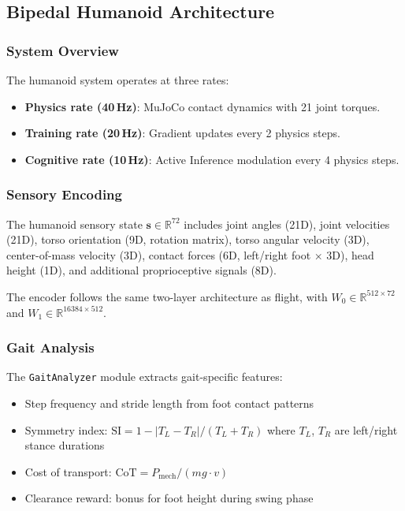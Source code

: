 \documentclass[11pt,a4paper]{article}
\begin{document}
\subsection{Bipedal Humanoid Architecture}

\subsubsection{System Overview}

The humanoid system operates at three rates:
\begin{itemize}
  \item \textbf{Physics rate (40\,Hz)}: MuJoCo contact dynamics with 21 joint torques.
  \item \textbf{Training rate (20\,Hz)}: Gradient updates every 2 physics steps.
  \item \textbf{Cognitive rate (10\,Hz)}: Active Inference modulation every 4 physics steps.
\end{itemize}

\subsubsection{Sensory Encoding}

The humanoid sensory state $\mathbf{s} \in \mathbb{R}^{72}$ includes joint angles (21D), joint velocities (21D), torso orientation (9D, rotation matrix), torso angular velocity (3D), center-of-mass velocity (3D), contact forces (6D, left/right foot $\times$ 3D), head height (1D), and additional proprioceptive signals (8D).

The encoder follows the same two-layer architecture as flight, with $W_0 \in \mathbb{R}^{512 \times 72}$ and $W_1 \in \mathbb{R}^{16384 \times 512}$.

\subsubsection{Gait Analysis}

The \texttt{GaitAnalyzer} module extracts gait-specific features:
\begin{itemize}
  \item Step frequency and stride length from foot contact patterns
  \item Symmetry index: $\text{SI} = 1 - |T_L - T_R| / (T_L + T_R)$ where $T_L$, $T_R$ are left/right stance durations
  \item Cost of transport: $\text{CoT} = P_{\text{mech}} / (mg \cdot v)$
  \item Clearance reward: bonus for foot height during swing phase
\end{itemize}
\end{document}
